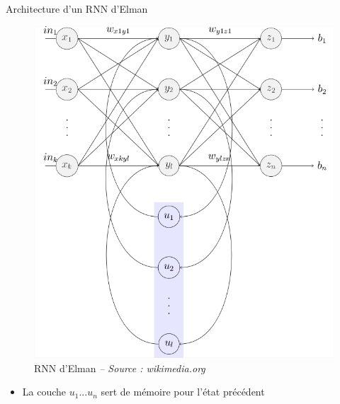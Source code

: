 \begin{frame}{Architecture d'un RNN d'Elman}
    \begin{figure}
        \includegraphics[height=.65\textheight,width=\textwidth,keepaspectratio]{images/Elman_srnn}
        \caption{RNN d'Elman {\scriptsize\it -- Source : wikimedia.org}}
    \end{figure}
    \vspace{-.5cm}
	\begin{itemize} 
		\item La couche $u_1 ... u_n$ sert de mémoire pour l'état précédent 
	\end{itemize}
\end{frame}
